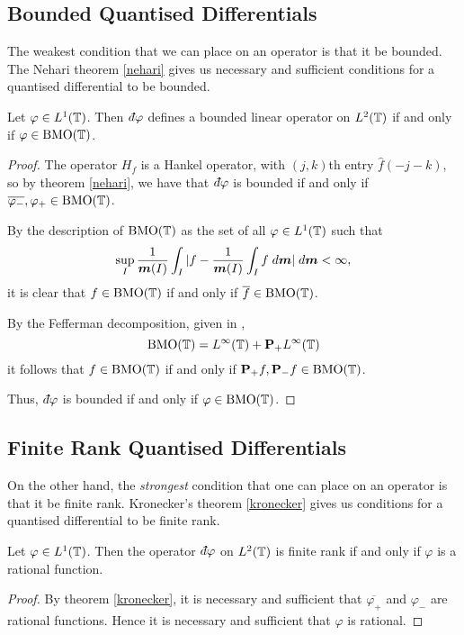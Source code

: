 \subsection{Bounded Quantised Differentials}
The weakest condition that we can place on an operator is that it be bounded.
The Nehari theorem \ref{nehari} gives us necessary and sufficient conditions
for a quantised differential to be bounded.
\begin{proposition}
    \label{boundedDifferentials}
    Let $\varphi \in L^1(\mathbb{T})$. Then $\qd \varphi$ defines a bounded
    linear operator on $L^2(\mathbb{T})$ if and only if $\varphi \in \operatorname{BMO}(\mathbb{T})$.
\end{proposition}
\begin{proof}
    The operator $H_{f}$ is a Hankel operator, with $(j,k)$th entry $\hat{f}(-j-k)$,
    so by theorem \ref{nehari}, we have that $\qd \varphi$ is bounded
    if and only if $\overline{\varphi_-},\varphi_+ \in \operatorname{BMO}(\mathbb{T})$. 
    
    By the description of $\operatorname{BMO}(\mathbb{T})$ as the set of all $\varphi \in L^1(\mathbb{T})$
    such that
    \begin{equation}
        \sup_{I} \frac{1}{\boldsymbol{m}(I)} \int_{I} |f-\frac{1}{\boldsymbol{m}(I)}\int_I f\;d\boldsymbol{m}| \;d\boldsymbol{m} < \infty,
    \end{equation}
    it is clear that $f \in \operatorname{BMO}(\mathbb{T})$ if and only if $\overline{f} \in \operatorname{BMO}(\mathbb{T})$.
    
    By the Fefferman decomposition, given in \cite{Garnett},
    \begin{equation}
        \operatorname{BMO}(\mathbb{T}) = L^\infty(\mathbb{T})+\mathbf{P}_+L^\infty(\mathbb{T})
    \end{equation}
    it follows that $f \in \operatorname{BMO}(\mathbb{T})$ if and only if $\mathbf{P}_+f,\mathbf{P}_-f \in \operatorname{BMO}(\mathbb{T})$.
    
    Thus, $\qd \varphi$ is bounded if and only if $\varphi \in \operatorname{BMO}(\mathbb{T})$.
\end{proof}



\subsection{Finite Rank Quantised Differentials}
On the other hand, the \emph{strongest} condition that one
can place on an operator is that it be finite rank. Kronecker's theorem \ref{kronecker}
gives us conditions for a quantised differential to be finite rank.
\begin{proposition}
    Let $\varphi \in L^1(\mathbb{T})$. Then the operator $\qd \varphi$
    on $L^2(\mathbb{T})$ is finite rank if and only if $\varphi$
    is a rational function.
\end{proposition}
\begin{proof}
    By theorem \ref{kronecker}, it is necessary and sufficient
    that $\overline{\varphi_+}$ and $\varphi_-$ are rational
    functions. Hence it is necessary and sufficient that $\varphi$
    is rational.
\end{proof}


